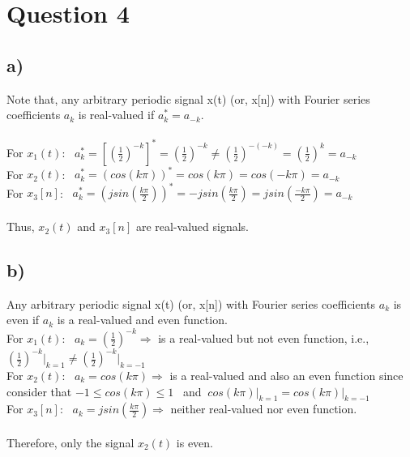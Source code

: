 \documentclass[12pt]{article}
\begin{document}
    \section*{Question 4}
    \subsection*{a)}
    Note that, any arbitrary periodic signal x(t) (or, x[n]) with Fourier series coefficients \(a_k\) is real-valued if  \(a^{*}_k = a_{-k}\). \\ \\
    For \(x_1(t)\): \ 
    \begin{math}
     a^{*}_k =  [(\frac{1}{2})^{-k}]^{*} = (\frac{1}{2})^{-k} \neq (\frac{1}{2})^{-(-k)}  = (\frac{1}{2})^{k} = a_{-k} \end{math} \\
    For \(x_2(t)\): \ 
    \begin{math}
     a^{*}_k =  (cos(k\pi))^{*} = cos(k\pi) = cos(-k\pi) = a_{-k} \end{math} \\
    For \(x_3[n]\): \ 
    \begin{math}
     a^{*}_k =  (jsin(\frac{k\pi}{2}))^{*} = -jsin(\frac{k\pi}{2})= jsin(\frac{-k\pi}{2}) = a_{-k} \end{math} \\ \\
    Thus, \(x_2(t)\) and \(x_3[n]\) are real-valued signals.
      
    \subsection*{b)}
    Any arbitrary periodic signal x(t) (or, x[n]) with Fourier series coefficients \(a_k\) is even if \(a_k\) is a real-valued and even function.\\
    For \(x_1(t)\): \ 
    \begin{math}
     a_k =  (\frac{1}{2})^{-k}  \Rightarrow \end{math} is a real-valued but not even function, i.e., \begin{math} (\frac{1}{2})^{-k} \Big|_{k=1} \neq (\frac{1}{2})^{-k} \Big|_{k=-1} \end{math}\\
    For \(x_2(t)\): \ 
    \begin{math}
     a_k =  cos(k\pi) \Rightarrow \end{math} is a real-valued and also an even function since consider that \begin{math} -1\leq cos(k\pi) \leq 1 \end{math} \ and \begin{math}\ cos(k\pi)\Big|_{k=1} = cos(k\pi)\Big|_{k=-1}\end{math} \\
    For \(x_3[n]\): \ 
    \begin{math}
     a_k =  jsin(\frac{k\pi}{2}) \Rightarrow  \end{math} neither real-valued nor even function. \\ \\
    Therefore, only the signal \(x_2(t)\) is even. 
      
\end{document}
